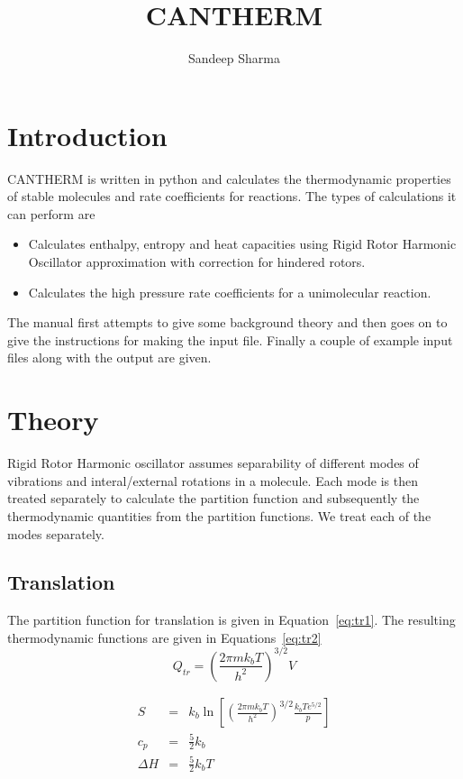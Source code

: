 \documentclass[a4paper,12pt]{article}
\title{CANTHERM}
\author{Sandeep Sharma}
\begin{document}
 \maketitle
\tableofcontents
\section{Introduction}
CANTHERM is written in python and calculates the thermodynamic properties of stable molecules and rate coefficients for reactions. The types of calculations it can perform are
\begin{itemize}
 \item Calculates enthalpy, entropy and heat capacities using Rigid Rotor Harmonic Oscillator approximation with correction for hindered rotors.
\item Calculates the high pressure rate coefficients for a unimolecular reaction.
\end{itemize}
The manual first attempts to give some background theory and then goes on to give the instructions for making the input file. Finally a couple of example input files along with the output are given.

\section{Theory}
Rigid Rotor Harmonic oscillator assumes separability of different modes of vibrations and interal/external rotations in a molecule. Each mode is then treated separately to calculate the partition function and subsequently the thermodynamic quantities from the partition functions. We treat each of the modes separately.
\subsection{Translation}
The partition function for translation is given in Equation~\ref{eq:tr1}. The resulting thermodynamic functions are given in Equations~\ref{eq:tr2}
\begin{equation}
 Q_{tr} = \left(\frac{2\pi m k_bT}{h^2}\right)^{3/2}V
\label{eq:tr1}
\end{equation}

\begin{eqnarray}
 S%
&=&k_b \ln\left[\left(\frac{2\pi m k_bT}{h^2}\right)^{3/2} \frac{k_bTe^{5/2}}{p}\right]\nonumber\\
c_p&=& \frac{5}{2}k_b \nonumber \\
\Delta H&=& \frac{5}{2}k_bT
\label{eq:tr2}
\end{eqnarray}
\end{document}
